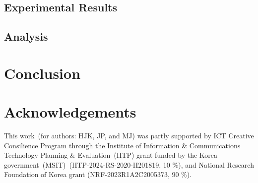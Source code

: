 \documentclass[11pt]{article}
\begin{document}
\subsection{Experimental Results}


\subsection{Analysis}
\label{sec:analysis}


\section{Conclusion}


\section*{Acknowledgements}
This work~(for authors: HJK, JP, and MJ) was partly supported by ICT Creative Consilience Program through the Institute of Information \& Communications Technology Planning \& Evaluation~(IITP) grant funded by the Korea government~(MSIT)~(IITP-2024-RS-2020-II201819, 10 \%), and National Research Foundation of Korea grant (NRF-2023R1A2C2005373, 90 \%).



\appendix
\label{sec:appendix}

\end{document}
